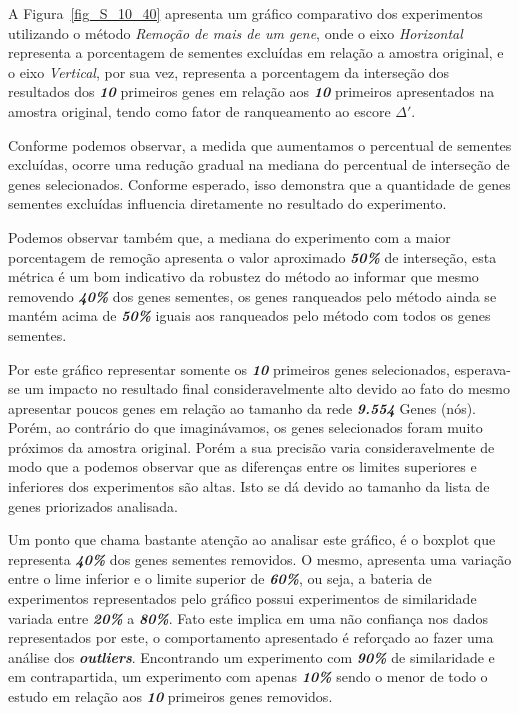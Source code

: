 %
A Figura~\ref{fig_S_10_40} apresenta um gráfico comparativo dos experimentos utilizando o método \textit{Remoção de mais de um gene}, onde o eixo \textsl{Horizontal} representa a porcentagem de sementes excluídas em relação a amostra original, e o eixo \textsl{Vertical}, por sua vez, representa a porcentagem da interseção dos resultados dos \textsl{\textbf{10}} primeiros genes em relação aos \textsl{\textbf{10}} primeiros apresentados na amostra original, tendo como fator de ranqueamento ao escore \textsl{\textbf{$\Delta'$}}.
%

Conforme podemos observar, a medida que aumentamos o percentual de sementes excluídas, ocorre uma redução gradual na mediana do percentual de interseção de genes selecionados.
Conforme esperado, isso demonstra que a quantidade de genes sementes excluídas influencia diretamente no resultado do experimento.
%

%
Podemos observar também que, a mediana do experimento com a maior porcentagem de remoção apresenta o valor aproximado \textsl{\textbf{50\%}} de interseção, esta métrica é um bom indicativo da robustez do método ao informar que mesmo removendo \textsl{\textbf{40\%}} dos genes sementes, os genes ranqueados pelo método ainda se mantém acima de \textsl{\textbf{50\%}} iguais aos ranqueados pelo método com todos os genes sementes.

Por este gráfico representar somente os \textsl{\textbf{10}} primeiros genes selecionados, esperava-se um impacto no resultado final consideravelmente alto devido ao fato do mesmo apresentar poucos genes em relação ao tamanho da rede \textsl{\textbf{9.554}} Genes (nós). Porém, ao contrário do que imaginávamos, os genes selecionados foram muito próximos da amostra original. Porém a sua precisão varia consideravelmente de modo que a podemos observar que as diferenças entre os limites superiores e inferiores dos experimentos são altas. Isto se dá devido ao tamanho da lista de genes priorizados analisada.
%

Um ponto que chama bastante atenção ao analisar este gráfico, é o boxplot que representa \textbf{\textsl{40\%}} dos genes sementes removidos. O mesmo, apresenta uma variação entre o lime inferior e o limite superior de \textbf{\textsl{60\%}}, ou seja, a bateria de experimentos representados pelo gráfico possui experimentos de similaridade variada entre \textbf{\textsl{20\%}} a \textbf{\textsl{80\%}}. Fato este implica em uma não confiança nos dados representados por este, o comportamento apresentado é reforçado ao fazer uma análise dos \textbf{\textsl{outliers}}. Encontrando um experimento com \textbf{\textsl{90\%}} de similaridade e em contrapartida, um experimento com apenas \textbf{\textsl{10\%}} sendo o menor de todo o estudo em relação aos \textbf{\textsl{10}} primeiros genes removidos.

